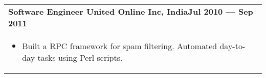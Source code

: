 \documentclass{article}
\begin{document}
\begin{tabular}{p{\dimexpr\linewidth-2\tabcolsep}}
    \bigskip
    {\bfseries Software Engineer \hfill United Online Inc, India\hfill Jul 2010 --- Sep 2011} \\
    \begin{itemize}
      \item Built a RPC framework for spam filtering.  Automated day-to-day tasks using Perl scripts.
    \end{itemize}

\end{tabular}
\end{document}
